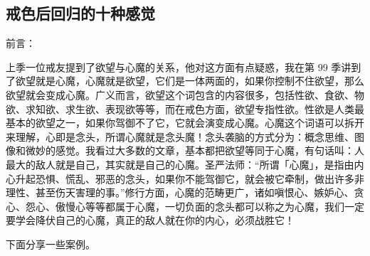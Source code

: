 \subsection{戒色后回归的十种感觉}

前言：

上季一位戒友提到了欲望与心魔的关系，他对这方面有点疑惑，我在第 99 季讲到了欲望就是心魔，心魔就是欲望，它们是一体两面的，如果你控制不住欲望，那么欲望就会变成心魔。广义而言，欲望这个词包含的内容很多，包括性欲、食欲、物欲、求知欲、求生欲、表现欲等等，而在戒色方面，欲望专指性欲。性欲是人类最基本的欲望之一，如果你驾御不了它，它就会演变成心魔。心魔这个词语可以拆开来理解，心即是念头，所谓心魔就是念头魔！念头袭脑的方式分为：概念思维、图像和微妙的感觉。我看过大多数的文章，基本都把欲望等同于心魔，有句话叫：人最大的敌人就是自己，其实就是自己的心魔。圣严法师：“所谓「心魔」，是指由内心升起恐惧、慌乱、邪恶的念头，如果你不能驾御它，就会被它牵制，做出许多非理性、甚至伤天害理的事。”修行方面，心魔的范畴更广，诸如嗔恨心、嫉妒心、贪心、怨心、傲慢心等等都属于心魔，一切负面的念头都可以称之为心魔，我们一定要学会降伏自己的心魔，真正的敌人就在你的内心，必须战胜它！

下面分享一些案例。

